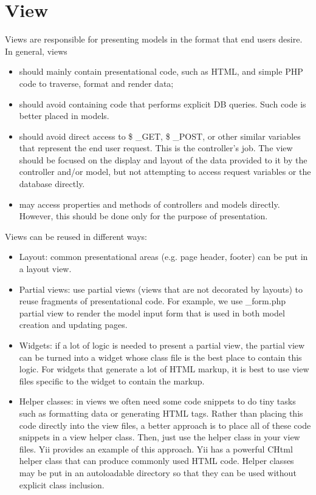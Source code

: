 \section{View}

Views are responsible for presenting models in the format that end users desire. In general, views

\begin{itemize}
\item should mainly contain presentational code, such as HTML, and simple PHP code to traverse, format and render data;
\item should avoid containing code that performs explicit DB queries. Such code is better placed in models.
\item should avoid direct access to \$ \_GET, \$ \_POST, or other similar variables that represent the end user request. This is the controller's job. The view should be focused on the display and layout of the data provided to it by the controller and/or model, but not attempting to access request variables or the database directly.
\item may access properties and methods of controllers and models directly. However, this should be done only for the purpose of presentation.

\end{itemize}


Views can be reused in different ways:


\begin{itemize}
\item Layout: common presentational areas (e.g. page header, footer) can be put in a layout view.
\item Partial views: use partial views (views that are not decorated by layouts) to reuse fragments of presentational code. For example, we use \_form.php partial view to render the model input form that is used in both model creation and updating pages.
\item Widgets: if a lot of logic is needed to present a partial view, the partial view can be turned into a widget whose class file is the best place to contain this logic. For widgets that generate a lot of HTML markup, it is best to use view files specific to the widget to contain the markup.
\item Helper classes: in views we often need some code snippets to do tiny tasks such as formatting data or generating HTML tags. Rather than placing this code directly into the view files, a better approach is to place all of these code snippets in a view helper class. Then, just use the helper class in your view files. Yii provides an example of this approach. Yii has a powerful CHtml helper class that can produce commonly used HTML code. Helper classes may be put in an autoloadable directory so that they can be used without explicit class inclusion.
\end{itemize}

